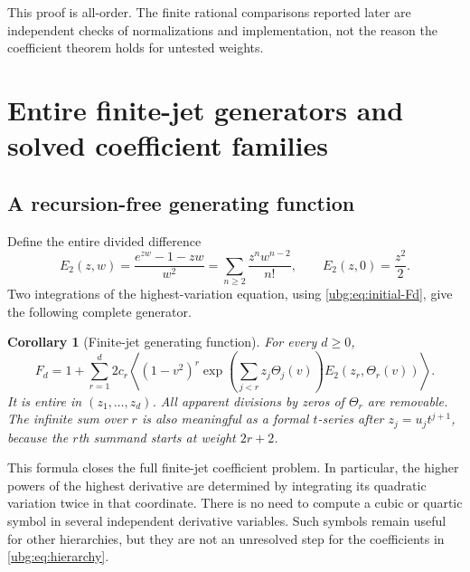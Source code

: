 \documentclass[11pt,letterpaper]{article}
\numberwithin{equation}{section}
\newtheorem{corollary}[theorem]{Corollary}
\theoremstyle{definition}\newtheorem{definition}[theorem]{Definition}
\theoremstyle{remark}\newtheorem{remark}[theorem]{Remark}
\newcommand{\av}[1]{\left\langle #1\right\rangle}
\begin{document}
This proof is all-order. The finite rational comparisons reported later
are independent checks of normalizations and implementation, not the
reason the coefficient theorem holds for untested weights.

\section{Entire finite-jet generators and solved coefficient families}
\label{ubg:sec:families}

\subsection{A recursion-free generating function}
Define the entire divided difference
\begin{equation}\label{ubg:eq:E2}
 E_2(z,w)=\frac{e^{zw}-1-zw}{w^2}
       =\sum_{n\ge2}\frac{z^nw^{n-2}}{n!},
 \qquad E_2(z,0)=\frac{z^2}{2}.
\end{equation}
Two integrations of the highest-variation equation, using
\eqref{ubg:eq:initial-Fd}, give the following complete generator.

\begin{corollary}[Finite-jet generating function]\label{ubg:cor:generator}
For every $d\ge0$,
\begin{equation}\label{ubg:eq:generator}
 \boxed{\displaystyle
 F_d=1+\sum_{r=1}^d2c_r\av{(1-v^2)^r
       \exp\left(\sum_{j<r}z_j\Theta_j(v)\right)
       E_2(z_r,\Theta_r(v))}.}
\end{equation}
It is entire in $(z_1,\ldots,z_d)$. All apparent divisions by zeros of
$\Theta_r$ are removable. The infinite sum over $r$ is also meaningful
as a formal $t$-series after $z_j=u_jt^{j+1}$, because the $r$th
summand starts at weight $2r+2$.
\end{corollary}

This formula closes the full finite-jet coefficient problem. In
particular, the higher powers of the highest derivative are determined
by integrating its quadratic variation twice in that coordinate.
There is no need to compute a cubic or quartic symbol in several
independent derivative variables. Such symbols remain useful for other
hierarchies, but they are not an unresolved step for the coefficients
in \eqref{ubg:eq:hierarchy}.
\end{document}
